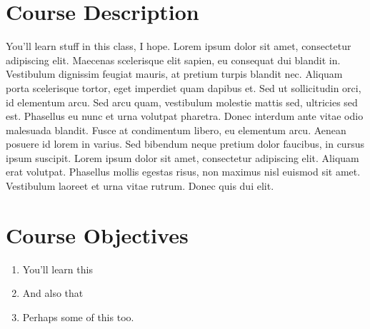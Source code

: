 \documentclass[
      12pt,
        ]{article}
\begin{document}



 


\hypertarget{course-description}{%
\section{Course Description}\label{course-description}}

You'll learn stuff in this class, I hope. Lorem ipsum dolor sit amet,
consectetur adipiscing elit. Maecenas scelerisque elit sapien, eu
consequat dui blandit in. Vestibulum dignissim feugiat mauris, at
pretium turpis blandit nec. Aliquam porta scelerisque tortor, eget
imperdiet quam dapibus et. Sed ut sollicitudin orci, id elementum arcu.
Sed arcu quam, vestibulum molestie mattis sed, ultricies sed est.
Phasellus eu nunc et urna volutpat pharetra. Donec interdum ante vitae
odio malesuada blandit. Fusce at condimentum libero, eu elementum arcu.
Aenean posuere id lorem in varius. Sed bibendum neque pretium dolor
faucibus, in cursus ipsum suscipit. Lorem ipsum dolor sit amet,
consectetur adipiscing elit. Aliquam erat volutpat. Phasellus mollis
egestas risus, non maximus nisl euismod sit amet. Vestibulum laoreet et
urna vitae rutrum. Donec quis dui elit.

\hypertarget{course-objectives}{%
\section{Course Objectives}\label{course-objectives}}

\begin{enumerate}
\def\labelenumi{\arabic{enumi}.}
\item
  You'll learn this
\item
  And also that
\item
  Perhaps some of this too.
\end{enumerate}
\end{document}
